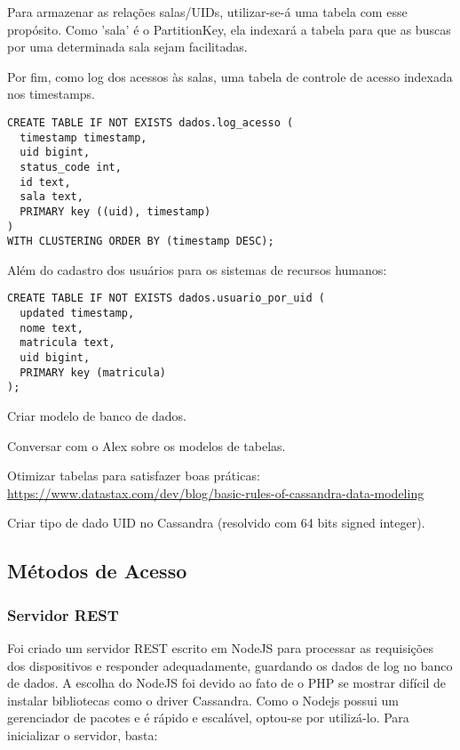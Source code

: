 \documentclass[11pt]{article}
\begin{document}
Para armazenar as relações salas/UIDs, utilizar-se-á uma tabela com esse propósito. Como 'sala' é o PartitionKey, ela indexará a tabela para que as buscas por uma determinada sala sejam facilitadas.

Por fim, como log dos acessos às salas, uma tabela de controle de acesso indexada nos timestamps.

\begin{lstlisting}
CREATE TABLE IF NOT EXISTS dados.log_acesso ( 
  timestamp timestamp,
  uid bigint,
  status_code int,
  id text,
  sala text,
  PRIMARY key ((uid), timestamp)
)
WITH CLUSTERING ORDER BY (timestamp DESC);
\end{lstlisting}

Além do cadastro dos usuários para os sistemas de recursos humanos:

\begin{lstlisting}
CREATE TABLE IF NOT EXISTS dados.usuario_por_uid ( 
  updated timestamp,
  nome text,
  matricula text,
  uid bigint,
  PRIMARY key (matricula)
);
\end{lstlisting}

\begin{todobox}
\begin{todolist}
\item[\done] Criar modelo de banco de dados.
\item[\done] Conversar com o Alex sobre os modelos de tabelas.
\item Otimizar tabelas para satisfazer boas práticas: \url{https://www.datastax.com/dev/blog/basic-rules-of-cassandra-data-modeling}
\item[\done] Criar tipo de dado UID no Cassandra (resolvido com 64 bits signed integer).
\end{todolist}
\end{todobox}



\subsection{Métodos de Acesso}

\subsubsection{Servidor REST}

Foi criado um servidor REST escrito em NodeJS para processar as requisições dos dispositivos e responder adequadamente, guardando os dados de log no banco de dados. A escolha do NodeJS foi devido ao fato de o PHP se mostrar difícil de instalar bibliotecas como o driver Cassandra. Como o Nodejs possui um gerenciador de pacotes e é rápido e escalável, optou-se por utilizá-lo. Para inicializar o servidor, basta:
\end{document}
